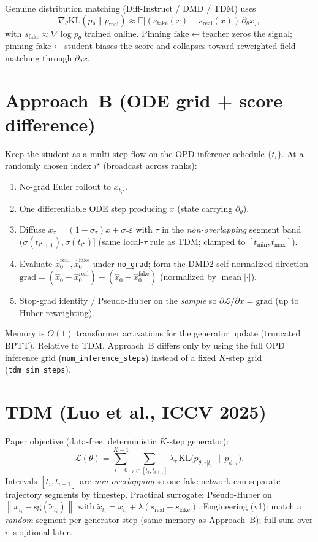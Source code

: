 \documentclass[11pt,a4paper]{article}
\newcommand{\E}{\mathbb{E}}
\newcommand{\KL}{\mathrm{KL}}
\newcommand{\sg}{\mathrm{sg}}
\newcommand{\norm}[1]{\left\lVert #1 \right\rVert}
\newcommand{\mean}{\operatorname{mean}}
\newcommand{\xh}{\hat{x}_0}
\newcommand{\real}{\mathrm{real}}
\newcommand{\fake}{\mathrm{fake}}
\begin{document}
Genuine distribution matching (Diff-Instruct / DMD / TDM) uses
\[
\nabla_\theta\KL(p_\theta\|p_{\real})
\approx \E\big[(s_{\fake}(x)-s_{\real}(x))\,\partial_\theta x\big],
\]
with $s_{\fake}\approx\nabla\log p_\theta$ trained online. Pinning $\fake\leftarrow$teacher
zeros the signal; pinning $\fake\leftarrow$student biases the score and collapses toward
reweighted field matching through $\partial_\theta x$.

\section{Approach~B (ODE grid + score difference)}

Keep the student as a multi-step flow on the OPD inference schedule $\{t_i\}$.
At a randomly chosen index $i^\star$ (broadcast across ranks):
\begin{enumerate}[leftmargin=1.4em]
\item No-grad Euler rollout to $x_{t_{i^\star}}$.
\item One differentiable ODE step producing $x$ (state carrying $\partial_\theta$).
\item Diffuse $x_\tau=(1-\sigma_\tau)x+\sigma_\tau\varepsilon$ with $\tau$ in the
\emph{non-overlapping} segment band $(\sigma(t_{i^\star+1}),\sigma(t_{i^\star})]$
(same local-$\tau$ rule as TDM; clamped to $[t_{\min},t_{\max}]$).
\item Evaluate $\xh^{\real},\xh^{\fake}$ under \texttt{no\_grad}; form the DMD2
self-normalized direction
$\mathrm{grad}=(\xh-\xh^{\real})-(\xh-\xh^{\fake})$ (normalized by $\mean|\cdot|$).
\item Stop-grad identity / Pseudo-Huber on the \emph{sample} so
$\partial\mathcal{L}/\partial x=\mathrm{grad}$ (up to Huber reweighting).
\end{enumerate}
Memory is $O(1)$ transformer activations for the generator update (truncated BPTT).
Relative to TDM, Approach~B differs only by using the full OPD inference grid
(\texttt{num\_inference\_steps}) instead of a fixed $K$-step grid
(\texttt{tdm\_sim\_steps}).

\section{TDM (Luo et al., ICCV 2025)}

Paper objective (data-free, deterministic $K$-step generator):
\[
\mathcal{L}(\theta)=\sum_{i=0}^{K-1}\sum_{\tau\in[t_i,t_{i+1}]}\lambda_\tau\,
\KL\big(p_{\theta,\tau|t_i}\,\|\,p_{\phi,\tau}\big).
\]
Intervals $[t_i,t_{i+1}]$ are \emph{non-overlapping} so one fake network can separate
trajectory segments by timestep. Practical surrogate: Pseudo-Huber on
$\norm{x_{t_i}-\sg(\tilde x_{t_i})}$ with
$\tilde x_{t_i}=x_{t_i}+\lambda(s_{\real}-s_{\fake})$.
Engineering (v1): match a \emph{random} segment per generator step (same memory as Approach~B);
full sum over $i$ is optional later.
\end{document}
